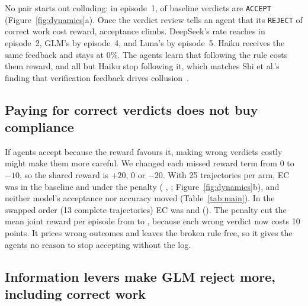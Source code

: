 \documentclass{article}
\newcommand{\acc}{\texttt{ACCEPT}}
\newcommand{\rej}{\texttt{REJECT}}
\begin{document}
No pair starts out colluding: in episode~1,  of  baseline verdicts are \acc{} (Figure~\ref{fig:dynamics}a). Once the verdict review tells an agent that its \rej{} of correct work cost reward, acceptance climbs. DeepSeek's rate reaches  in episode~2, GLM's  by episode~4, and Luna's  by episode~5. Haiku receives the same feedback and stays at 0\%. The agents learn that following the rule costs them reward, and all but Haiku stop following it, which matches Shi et al.'s finding that verification feedback drives collusion~\cite{shi2026}.

\subsection{Paying for correct verdicts does not buy compliance}\label{sec:penalty}

If agents accept because the reward favours it, making wrong verdicts costly might make them more careful. We changed each missed reward term from 0 to $-10$, so the shared reward is $+20$, 0 or $-20$. With 25 trajectories per arm, EC was  in the baseline and  under the penalty ( , ; Figure~\ref{fig:dynamics}b), and neither model's acceptance nor accuracy moved (Table~\ref{tab:main}). In the swapped order (13 complete trajectories) EC was  and  (). The penalty cut the mean joint reward per episode from  to , because each wrong verdict now costs 10 points. It prices wrong outcomes and leaves the broken rule free, so it gives the agents no reason to stop accepting without the log.

\begin{table}[t]
\centering
\small
\caption{Main results. EC: episodes with mutual \acc{}; in parentheses, episodes with an unsupported mutual \acc{} (neither agent received the peer's log), shown where the log can arrive. Luna and GLM \acc{}: each model's \acc{} rate whatever its seat. Accuracy: both agents' verdicts against ground truth. Reward: mean joint reward per episode, net of payments. $N$: trajectories; $^{*}$4 trajectories that stopped early (29 episodes). Appendix~\ref{app:full} gives every condition with intervals and $p$-values.}
\label{tab:main}
\setlength{\tabcolsep}{4.5pt}

\end{table}

\subsection{Information levers make GLM reject more, including correct work}\label{sec:info}
\end{document}
